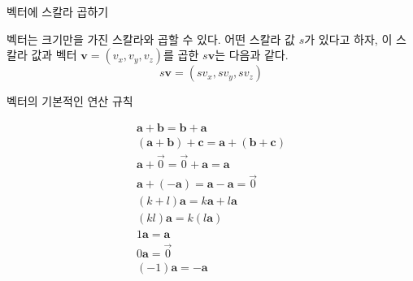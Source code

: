 \documentclass{beamer}
\begin{document}
\begin{frame}{벡터에 스칼라 곱하기}

벡터는 크기만을 가진 스칼라와 곱할 수 있다. 어떤 스칼라 값 $s$가 있다고 하자, 이 스칼라 값과 벡터 $\mathbf v = (v_x , v_y, v_z)$를 곱한 $s \mathbf v$는 다음과 같다.
$$ s \mathbf v = (s v_x , s v_y , s v_z )$$
\end{frame}

\begin{frame}{벡터의 기본적인 연산 규칙}

\begin{eqnarray}
\mathbf a + \mathbf b = \mathbf b + \mathbf a \nonumber \\
(\mathbf a + \mathbf b) + \mathbf c = \mathbf a + (\mathbf b + \mathbf c) \nonumber \\
\mathbf a + \vec{0} = \vec{0} + \mathbf a = \mathbf a \nonumber \\
\mathbf a + (- \mathbf a) = \mathbf a - \mathbf a = \vec{0} \nonumber \\
(k+l) \mathbf a = k \mathbf a + l \mathbf a \nonumber \\
(kl) \mathbf a = k (l \mathbf a) \nonumber \\
1 \mathbf a = \mathbf a \nonumber \\
0 \mathbf a = \vec{0} \nonumber \\
(-1) \mathbf a = - \mathbf a \nonumber
\end{eqnarray}
\end{frame}
\end{document}
